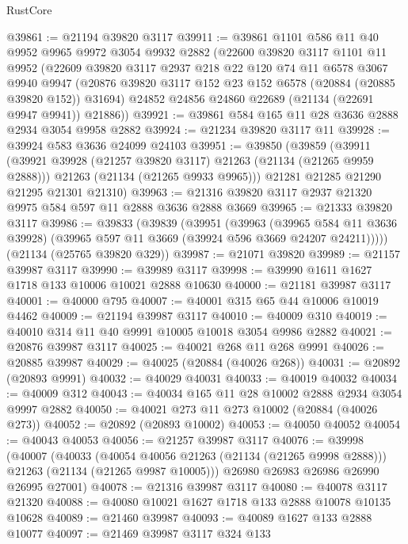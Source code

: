 \begin{lexlean}{RustCore}
\begin{coremodule}
@39861 := @21194 @39820 @3117
@39911 := @39861
    @1101
    @586
    @11
    @40
    @9952
    @9965
    @9972
    @3054
    @9932
    @2882
    (@22600
      @39820
      @3117
      @1101
      @11
      @9952
      (@22609
        @39820
        @3117
        @2937
        @218
        @22
        @120
        @74
        @11
        @6578
        @3067
        @9940
        @9947
        (@20876 @39820 @3117 @152 @23 @152 @6578 (@20884 (@20885 @39820 @152)) @31694)
        @24852
        @24856
        @24860
        @22689
        (@21134 (@22691 @9947 @9941))
        @21886))
@39921 := @39861 @584 @165 @11 @28 @3636 @2888 @2934 @3054 @9958 @2882
@39924 := @21234 @39820 @3117 @11
@39928 := @39924 @583 @3636 @24099 @24103
@39951 := @39850
    (@39859
      (@39911
        (@39921 @39928 (@21257 @39820 @3117) @21263 (@21134 (@21265 @9959 @2888)))
        @21263
        (@21134 (@21265 @9933 @9965)))
      @21281
      @21285
      @21290
      @21295
      @21301
      @21310)
@39963 := @21316 @39820 @3117 @2937 @21320 @9975 @584 @597 @11 @2888 @3636 @2888 @3669
@39965 := @21333 @39820 @3117
@39986 := @39833
    (@39839
      (@39951
        (@39963
          (@39965 @584 @11 @3636 @39928)
          (@39965 @597 @11 @3669 (@39924 @596 @3669 @24207 @24211)))))
    (@21134 (@25765 @39820 @329))
@39987 := @21071 @39820
@39989 := @21157 @39987 @3117
@39990 := @39989 @3117
@39998 := @39990 @1611 @1627 @1718 @133 @10006 @10021 @2888 @10630
@40000 := @21181 @39987 @3117
@40001 := @40000 @795
@40007 := @40001 @315 @65 @44 @10006 @10019 @4462
@40009 := @21194 @39987 @3117
@40010 := @40009 @310
@40019 := @40010 @314 @11 @40 @9991 @10005 @10018 @3054 @9986 @2882
@40021 := @20876 @39987 @3117
@40025 := @40021 @268 @11 @268 @9991
@40026 := @20885 @39987
@40029 := @40025 (@20884 (@40026 @268))
@40031 := @20892 (@20893 @9991)
@40032 := @40029 @40031
@40033 := @40019 @40032
@40034 := @40009 @312
@40043 := @40034 @165 @11 @28 @10002 @2888 @2934 @3054 @9997 @2882
@40050 := @40021 @273 @11 @273 @10002 (@20884 (@40026 @273))
@40052 := @20892 (@20893 @10002)
@40053 := @40050 @40052
@40054 := @40043 @40053
@40056 := @21257 @39987 @3117
@40076 := @39998
    (@40007
      (@40033
        (@40054 @40056 @21263 (@21134 (@21265 @9998 @2888)))
        @21263
        (@21134 (@21265 @9987 @10005)))
      @26980
      @26983
      @26986
      @26990
      @26995
      @27001)
@40078 := @21316 @39987 @3117
@40080 := @40078 @3117 @21320
@40088 := @40080 @10021 @1627 @1718 @133 @2888 @10078 @10135 @10628
@40089 := @21460 @39987
@40093 := @40089 @1627 @133 @2888 @10077
@40097 := @21469 @39987 @3117 @324 @133

\end{coremodule}
\end{lexlean}
